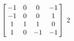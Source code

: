 {$\left[\hskip -3pt \begin{array}{cccc} -1&0&0&-1\\  -1&0&0&1
\\  1&1&1&0\\  1&0&-1&-1\end {array}\hskip -3pt \right] 
$} 
{$2$}

  

 

